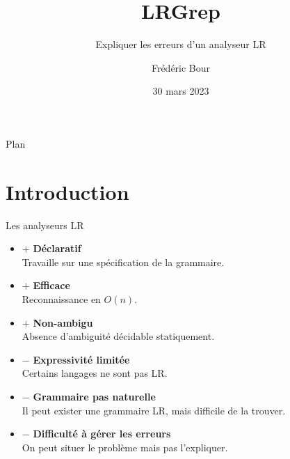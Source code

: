 \documentclass{beamer}          %
\title{LRGrep}  %
\subtitle{Expliquer les erreurs d'un analyseur LR}
\author{Frédéric Bour}                %
\institute{Tarides, Inria}          %
\date{30 mars 2023}                  %
\begin{document}
\begin{frame}
  \titlepage
\end{frame}

\begin{frame}{Plan}
  \tableofcontents
\end{frame}


\section{Introduction}

\newcommand\pro{\item[$+$]}
\newcommand\con{\item[$-$]}

\begin{frame}{Les analyseurs LR}

  \begin{itemize}
    \pro \textbf{Déclaratif} \\
         {\small Travaille sur une spécification de la grammaire.}
    \pro \textbf{Efficace} \\
         {\small Reconnaissance en $O(n)$.}
    \pro \textbf{Non-ambigu} \\
         {\small Absence d'ambiguité décidable statiquement.}
    \pause
    \con \textbf{Expressivité limitée} \\
         {\small Certains langages ne sont pas LR.}
    \con \textbf{Grammaire pas naturelle} \\
         {\small Il peut exister une grammaire LR, mais difficile de la trouver.}
    \con \textbf{Difficulté à gérer les erreurs} \\
         {\small On peut situer le problème mais pas l'expliquer.}
  \end{itemize}

\end{frame}
\end{document}
